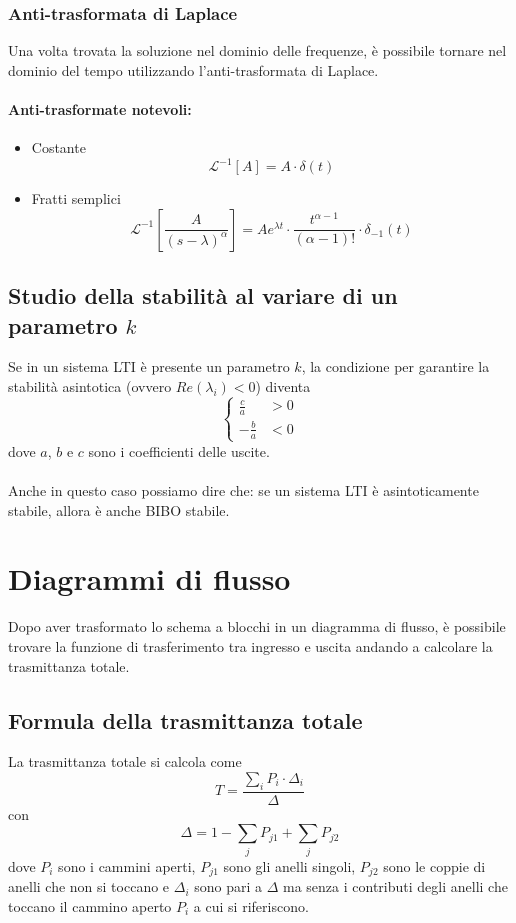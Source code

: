 \documentclass[a4paper]{article}
\begin{document}
	\subsubsection{Anti-trasformata di Laplace}
	Una volta trovata la soluzione nel dominio delle frequenze, è possibile tornare nel dominio del tempo utilizzando l'anti-trasformata di Laplace.
	\paragraph{Anti-trasformate notevoli:}
	\begin{itemize}
		\item Costante
			\[ \mathcal{L}^{-1} \left[ A \right] = A \cdot \delta(t) \]
		\item Fratti semplici
			\[
			\mathcal{L}^{-1} \left[ \frac{A}{(s - \lambda)^\alpha} \right] = A e^{\lambda t} \cdot \frac{t^{\alpha -1}}{(\alpha -1)!} \cdot \delta_{-1}(t)
			\]
	\end{itemize}
	
	\subsection{Studio della stabilità al variare di un parametro $k$}
	Se in un sistema LTI è presente un parametro $k$, la condizione per garantire la stabilità asintotica (ovvero $Re(\lambda_i)<0$) diventa
	\[
	\begin{cases}
	\frac{c}{a} &> 0 \\
	- \frac{b}{a} &< 0
	\end{cases}
	\]
	dove $a$, $b$ e $c$ sono i coefficienti delle uscite.
	\\ \\
	Anche in questo caso possiamo dire che: se un sistema LTI è asintoticamente stabile, allora è anche BIBO stabile.
	
	
	\section{Diagrammi di flusso}
	
	Dopo aver trasformato lo schema a blocchi in un diagramma di flusso, è possibile trovare la funzione di trasferimento tra ingresso e uscita andando a calcolare la trasmittanza totale.
	
	\subsection{Formula della trasmittanza totale}
	La trasmittanza totale si calcola come
	\[ T = \frac{\sum_i P_i \cdot \Delta_i}{\Delta} \]
	con
	\[ \Delta = 1 - \sum_j P_{j1} + \sum_j P_{j2} \]
	dove $P_i$ sono i cammini aperti, $P_{j1}$ sono gli anelli singoli, $P_{j2}$ sono le coppie di anelli che non si toccano e $\Delta_i$ sono pari a $\Delta$ ma senza i contributi degli anelli che toccano il cammino aperto $P_i$ a cui si riferiscono.
	
\end{document}
